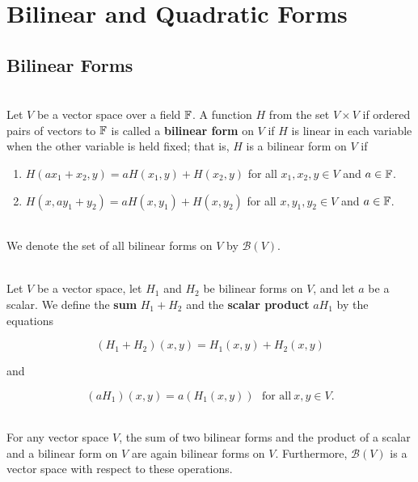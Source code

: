 \section{Bilinear and Quadratic Forms}

\subsection*{Bilinear Forms}

\begin{definition}
	\hfill\\
	Let $V$ be a vector space over a field $\mathbb{F}$. A function $H$ from the set $V \times V$ if ordered pairs of vectors to $\mathbb{F}$ is called a \textbf{bilinear form} on $V$ if $H$ is linear in each variable when the other variable is held fixed; that is, $H$ is a bilinear form on $V$ if

	\begin{enumerate}
		\item $H(ax_1 + x_2, y) = aH(x_1,y) + H(x_2,y)$ for all $x_1, x_2, y \in V$ and $a \in \mathbb{F}$.
		\item $H(x,ay_1+y_2) = aH(x,y_1) + H(x,y_2)$ for all $x,y_1,y_2 \in V$ and $a \in \mathbb{F}$.
	\end{enumerate}
\end{definition}

\begin{notation}
	\hfill\\
	We denote the set of all bilinear forms on $V$ by $\mathcal{B}(V)$.
\end{notation}

\begin{definition}
	\hfill\\
	Let $V$ be a vector space, let $H_1$ and $H_2$ be bilinear forms on $V$, and let $a$ be a scalar. We define the \textbf{sum} $H_1 + H_2$ and the \textbf{scalar product} $aH_1$ by the equations

	\[(H_1 + H_2)(x,y) = H_1(x,y) + H_2(x,y)\]

	and

	\[(aH_1)(x,y) = a(H_1(x,y))\ \ \ \text{for all}\ x,y \in V.\]
\end{definition}

\begin{theorem}
	\hfill\\
	For any vector space $V$, the sum of two bilinear forms and the product of a scalar and a bilinear form on $V$ are again bilinear forms on $V$. Furthermore, $\mathcal{B}(V)$ is a vector space with respect to these operations.
\end{theorem}

